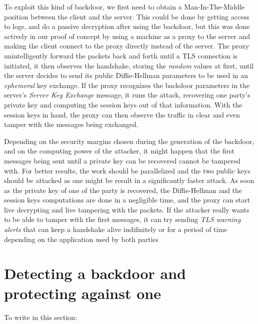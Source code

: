 \documentclass[a4paper,11pt,twocolumn]{article}
\begin{document}
To exploit this kind of backdoor, we first need to obtain a Man-In-The-Middle position between the client and the server. This could be done by getting access to logs, and do a passive decryption after using the backdoor, but this was done actively in our proof of concept by using a machine as a proxy to the server and making the client connect to the proxy directly instead of the server. The proxy unintelligently forward the packets back and forth until a TLS connection is initiated, it then observes the handshake, storing the \emph{random} values at first, until the server decides to send its public Diffie-Hellman parameters to be used in an \emph{ephemeral} key exchange. If the proxy recognizes the backdoor parameters in the server's \emph{Server Key Exchange} message, it runs the attack, recovering one party's private key and computing the session keys out of that information. With the session keys in hand, the proxy can then observe the traffic in clear and even tamper with the messages being exchanged.

Depending on the security margins chosen during the generation of the backdoor, and on the computing power of the attacker, it might happen that the first messages being sent until a private key can be recovered cannot be tampered with. For better results, the work should be parallelized and the two public keys should be attacked as one might be result in a significantly faster attack. As soon as the private key of one of the party is recovered, the Diffie-Hellman and the session keys computations are done in a negligible time, and the proxy can start live decrypting and live tampering with the packets. If the attacker really wants to be able to tamper with the first messages, it can try sending \emph{TLS warning alerts} that can keep a handshake alive indifinitely or for a period of time depending on the application used by both parties

\section{Detecting a backdoor and protecting against one}

To write in this section:
\end{document}
